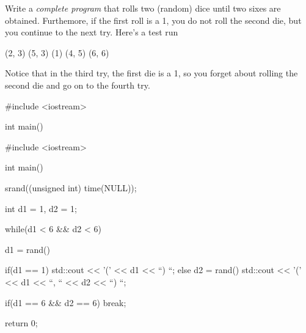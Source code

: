 \nextq
Write a \textit{complete program} that rolls two (random) dice until two
sixes are obtained.
Furthemore, if the first roll is a 1, you do not roll the second die,
but you continue to the next try.
Here's a test run
\begin{console}[fontsize=\footnotesize]
(2, 3) (5, 3) (1) (4, 5) (6, 6)
\end{console}
Notice that in the third try, the first die is a 1, so you forget
about rolling the second die and go on to the fourth try.
\\
\ANSWER
\begin{answercode}
#include <iostream>

int main()
{
  #include <iostream>

int main()
{
  srand((unsigned int) time(NULL));

  int d1 = 1, d2 = 1;

  while(d1 < 6 && d2 < 6)
  {
    
    d1 = rand() %

    if(d1 == 1)
    {
      std::cout << '(' << d1 << ``) ``;
    }
    else
    {
      d2 = rand() %
      std::cout << '(' << d1 << ``, `` << d2 << ``) ``;
    }
    
    if(d1 == 6 && d2 == 6)
    {
      break;
    }
  }
  return 0;
}
}
\end{answercode}


